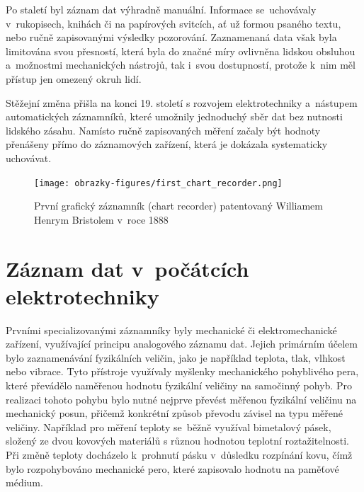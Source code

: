 Po staletí byl záznam dat výhradně manuální. Informace se~uchovávaly v~rukopisech, knihách či na papírových svitcích, ať už formou psaného textu, nebo ručně zapisovanými výsledky pozorování. Zaznamenaná data však byla limitována svou přesností, která byla do značné míry ovlivněna lidskou obsluhou a~možnostmi mechanických nástrojů, tak i~svou dostupností, protože k~nim měl přístup jen omezený okruh lidí.~\cite{rcp_analog_vs_digital}

Stěžejní změna přišla na konci 19. století s rozvojem elektrotechniky a~nástupem automatických záznamníků, které umožnily jednoduchý sběr dat bez nutnosti lidského zásahu. Namísto ručně zapisovaných měření začaly být hodnoty přenášeny přímo do záznamových zařízení, která je dokázala systematicky uchovávat.~\cite{origin_of_chart_recorders}

\begin{figure}[h] %
    \centering
    \texttt{[image: obrazky-figures/first\_chart\_recorder.png]}
    \caption{První grafický záznamník (chart recorder) patentovaný Williamem Henrym Bristolem v~roce 1888~\cite{bristol_chart_recorders}}
    \label{fig:chart_recorder}  
\end{figure}

\section{Záznam dat v~počátcích elektrotechniky}
\label{zaznam}
Prvními specializovanými záznamníky byly mechanické či elektromechanické zařízení, využívající principu analogového záznamu dat. Jejich primárním účelem bylo zaznamenávání fyzikálních veličin, jako je například teplota, tlak, vlhkost nebo vibrace. Tyto přístroje využívaly myšlenky mechanického pohyblivého pera, které převádělo naměřenou hodnotu fyzikální veličiny na samočinný pohyb. Pro realizaci tohoto pohybu bylo nutné nejprve převést měřenou fyzikální veličinu na mechanický posun, přičemž konkrétní způsob převodu závisel na typu měřené veličiny. Například pro měření teploty se~běžně využíval bimetalový pásek, složený ze dvou kovových materiálů s různou hodnotou teplotní roztažitelnosti. Při změně teploty docházelo k~prohnutí pásku v~důsledku rozpínání kovu, čímž bylo rozpohybováno mechanické pero, které zapisovalo hodnotu na paměťové médium.~\cite{thermohydro_graph}

